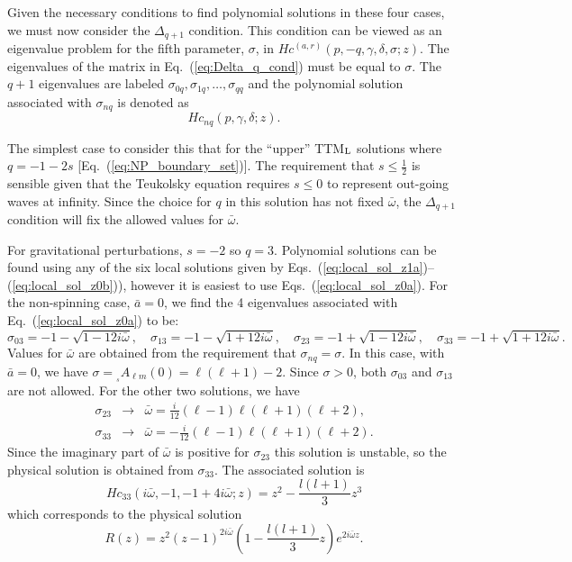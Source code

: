 \documentclass[11pt]{article}
\newcommand{\scA}[4][]{{}_{{}_{#2}}A^{#1}_{#3}(#4)}
\begin{document}
Given the necessary conditions to find polynomial solutions in these
four cases, we must now consider the $\Delta_{q+1}$ condition.  This
condition can be viewed as an eigenvalue problem for the fifth
parameter, $\sigma$, in $Hc^{(a,r)}(p,-q,\gamma,\delta,\sigma;z)$. The
eigenvalues of the matrix in Eq.~(\ref{eq:Delta_q_cond}) must be equal
to $\sigma$.  The $q+1$ eigenvalues are labeled
$\sigma_{0q},\sigma_{1q},\ldots,\sigma_{qq}$ and the polynomial
solution associated with $\sigma_{nq}$ is denoted as
\begin{equation}
  Hc_{nq}(p,\gamma,\delta;z).
\end{equation}

The simplest case to consider this that for the ``upper''
TTM${}_{\rm{L}}$ solutions where $q=-1-2s$
[Eq.~(\ref{eq:NP_boundary_set})].  The requirement that $s\le\frac12$
is sensible given that the Teukolsky equation requires $s\le0$ to
represent out-going waves at infinity.  Since the choice for $q$ in
this solution has not fixed $\bar\omega$, the $\Delta_{q+1}$ condition
will fix the allowed values for $\bar\omega$.

For gravitational perturbations, $s=-2$ so $q=3$.  Polynomial
solutions can be found using any of the six local solutions given by
Eqs.~(\ref{eq:local_sol_z1a})--(\ref{eq:local_sol_z0b})), however it
is easiest to use Eqs.~(\ref{eq:local_sol_z0a}).  For the non-spinning
case, $\bar{a}=0$, we find the 4 eigenvalues associated with
Eq.~(\ref{eq:local_sol_z0a}) to be:
\begin{equation}
\sigma_{03}=-1-\sqrt{1-12i\bar\omega},\quad
\sigma_{13}=-1-\sqrt{1+12i\bar\omega},\quad
\sigma_{23}=-1+\sqrt{1-12i\bar\omega},\quad
\sigma_{33}=-1+\sqrt{1+12i\bar\omega}.
\end{equation}
Values for $\bar\omega$ are obtained from the requirement that
$\sigma_{nq}=\sigma$.  In this case, with $\bar{a}=0$, we have
$\sigma=\scA{s}{\ell{m}}{0}=\ell(\ell+1)-2$.  Since $\sigma>0$, both
$\sigma_{03}$ and $\sigma_{13}$ are not allowed.  For the other
two solutions, we have
\begin{eqnarray}
  \sigma_{23}&\to&\bar\omega=\frac{i}{12}(\ell-1)\ell(\ell+1)(\ell+2), \\
  \sigma_{33}&\to&\bar\omega=-\frac{i}{12}(\ell-1)\ell(\ell+1)(\ell+2).
\end{eqnarray}
Since the imaginary part of $\bar\omega$ is positive for
$\sigma_{23}$ this solution is unstable, so the physical solution is
obtained from $\sigma_{33}$.  The associated solution is
\begin{equation}\label{eq:TTML_a0_H_sol1}
  Hc_{33}(i\bar\omega,-1,-1+4i\bar\omega;z) = z^2-\frac{l(l+1)}3z^3
\end{equation}
which corresponds to the physical solution
\begin{equation}\label{eq:TTML_a0_R_sol1}
  R(z) = z^2(z-1)^{2i\bar\omega}\left(1-\frac{l(l+1)}3z\right)e^{2i\bar\omega z}.
\end{equation}
\end{document}
